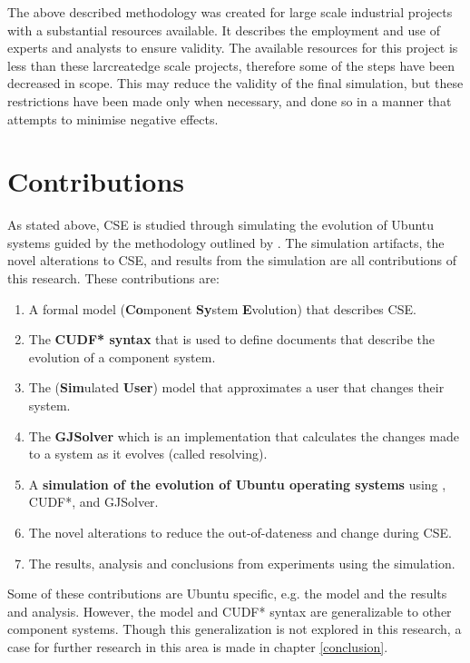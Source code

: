 The above described methodology was created for large scale industrial projects with a substantial resources available.
It describes the employment and use of experts and analysts to ensure validity.
The available resources for this project is less than these larcreatedge scale projects, therefore some of the steps have been decreased in scope.
This may reduce the validity of the final simulation, but these restrictions have been made only when necessary,
and done so in a manner that attempts to minimise negative effects.

\section{Contributions}
As stated above, CSE is studied through simulating the evolution of Ubuntu systems guided by the methodology outlined by \cite{Law2005}.
The simulation artifacts, the novel alterations to CSE, and results from the simulation are all contributions of this research. 
These contributions are:
\begin{enumerate}
  \item A formal model \textbf{\modelname} (\textbf{Co}mponent \textbf{Sy}stem \textbf{E}volution) that describes CSE. 
  \item The \textbf{CUDF* syntax} that is used to define documents that describe the evolution of a component system.
  \item The \textbf{\usermodel} (\textbf{Sim}ulated \textbf{User}) model that approximates a user that changes their system.
  \item The \textbf{GJSolver} which is an implementation that calculates the changes made to a system as it evolves (called resolving).
  \item A \textbf{simulation of the evolution of Ubuntu operating systems} using \modelname, CUDF*, \usermodel and GJSolver.
  \item The novel alterations to reduce the out-of-dateness and change during CSE. 
  \item The results, analysis and conclusions from experiments using the simulation.
\end{enumerate}

Some of these contributions are Ubuntu specific, e.g. the \usermodel model and the results and analysis.
However, the \modelname model and CUDF* syntax are generalizable to other component systems.
Though this generalization is not explored in this research, a case for further research in this area is made in chapter \ref{conclusion}.


